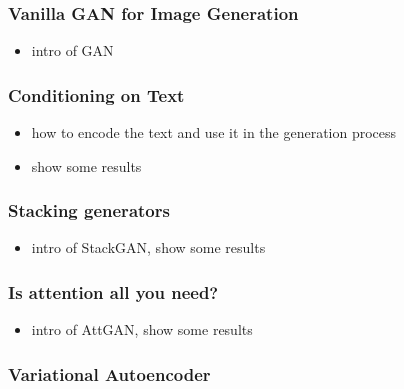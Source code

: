 \documentclass[
]{krantz}
\providecommand{\tightlist}{%
  \setlength{\itemsep}{0pt}\setlength{\parskip}{0pt}}
\begin{document}
\hypertarget{vanilla-gan-for-image-generation}{%
\subsubsection{Vanilla GAN for Image Generation}\label{vanilla-gan-for-image-generation}}

\begin{itemize}
\tightlist
\item
  intro of GAN
\end{itemize}

\hypertarget{conditioning-on-text}{%
\subsubsection{Conditioning on Text}\label{conditioning-on-text}}

\begin{itemize}
\tightlist
\item
  how to encode the text and use it in the generation process
\item
  show some results
\end{itemize}

\hypertarget{stacking-generators}{%
\subsubsection{Stacking generators}\label{stacking-generators}}

\begin{itemize}
\tightlist
\item
  intro of StackGAN, show some results
\end{itemize}

\hypertarget{is-attention-all-you-need}{%
\subsubsection{Is attention all you need?}\label{is-attention-all-you-need}}

\begin{itemize}
\tightlist
\item
  intro of AttGAN, show some results
\end{itemize}

\hypertarget{variational-autoencoder}{%
\subsubsection{Variational Autoencoder}\label{variational-autoencoder}}
\end{document}
